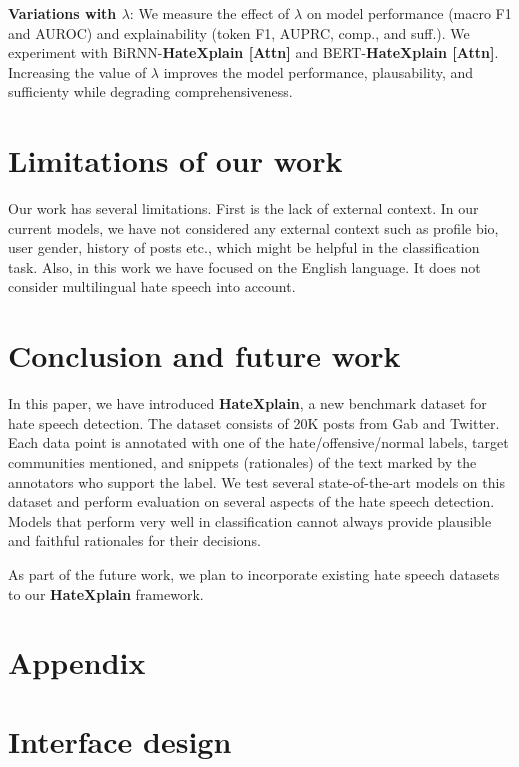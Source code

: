 \documentclass[letterpaper]{article} \usepackage{aaai21}  \usepackage{times}  \usepackage{helvet} \usepackage{courier}  \usepackage[hyphens]{url}  \usepackage{graphicx} \urlstyle{rm} \def\UrlFont{\rm}  \usepackage{natbib}  \usepackage{caption}
\begin{document}
\noindent\textbf{Variations with $\lambda$}: We measure the effect of $\lambda$ on model performance (macro F1 and AUROC) and explainability (token F1, AUPRC, comp., and suff.). We experiment with BiRNN-{\bf{HateXplain} [Attn]} and BERT-{\bf{HateXplain} [Attn]}. Increasing the value of $\lambda$ improves the model performance, plausability, and sufficienty while degrading comprehensiveness.


\section{Limitations of our work}
Our work has several limitations. First is the lack of external context. In our current models, we have not considered any external context such as profile bio, user gender, history of posts etc., which might be helpful in the classification task. Also, in this work we have focused on the English language. It does not consider multilingual hate speech into account.


\section{Conclusion and future work}
In this paper, we have introduced {\bf{HateXplain}}, a new benchmark dataset for hate speech detection. The dataset consists of 20K posts from Gab and Twitter. Each data point is annotated with one of the hate/offensive/normal labels, target communities mentioned, and snippets (rationales) of the text marked by the annotators who support the label. We test several state-of-the-art models on this dataset and perform evaluation on several aspects of the hate speech detection. Models that perform very well in classification cannot always provide plausible and faithful rationales for their decisions. 

As part of the future work, we plan to incorporate existing hate speech datasets~\cite{davidson2017automated,ousidhoum2019multilingual,founta2018large} to our {\bf{HateXplain}} framework. 





\section{Appendix}



\section{Interface design}
\end{document}
